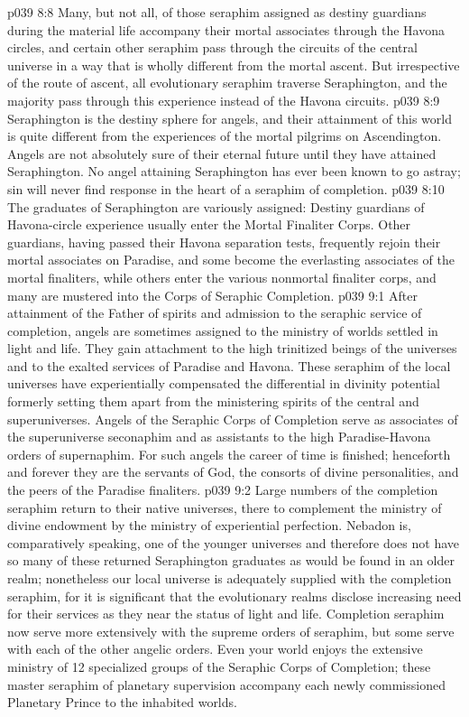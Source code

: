 \vs p039 8:8 Many, but not all, of those seraphim assigned as destiny guardians during the material life accompany their mortal associates through the Havona circles, and certain other seraphim pass through the circuits of the central universe in a way that is wholly different from the mortal ascent. But irrespective of the route of ascent, all evolutionary seraphim traverse Seraphington, and the majority pass through this experience instead of the Havona circuits.
\vs p039 8:9 \pc Seraphington is the destiny sphere for angels, and their attainment of this world is quite different from the experiences of the mortal pilgrims on Ascendington. Angels are not absolutely sure of their eternal future until they have attained Seraphington. No angel attaining Seraphington has ever been known to go astray; sin will never find response in the heart of a seraphim of completion.
\vs p039 8:10 The graduates of Seraphington are variously assigned: Destiny guardians of Havona\hyp{}circle experience usually enter the Mortal Finaliter Corps. Other guardians, having passed their Havona separation tests, frequently rejoin their mortal associates on Paradise, and some become the everlasting associates of the mortal finaliters, while others enter the various nonmortal finaliter corps, and many are mustered into the Corps of Seraphic Completion.
\vs p039 9:1 After attainment of the Father of spirits and admission to the seraphic service of completion, angels are sometimes assigned to the ministry of worlds settled in light and life. They gain attachment to the high trinitized beings of the universes and to the exalted services of Paradise and Havona. These seraphim of the local universes have experientially compensated the differential in divinity potential formerly setting them apart from the ministering spirits of the central and superuniverses. Angels of the Seraphic Corps of Completion serve as associates of the superuniverse seconaphim and as assistants to the high Paradise\hyp{}Havona orders of supernaphim. For such angels the career of time is finished; henceforth and forever they are the servants of God, the consorts of divine personalities, and the peers of the Paradise finaliters.
\vs p039 9:2 Large numbers of the completion seraphim return to their native universes, there to complement the ministry of divine endowment by the ministry of experiential perfection. Nebadon is, comparatively speaking, one of the younger universes and therefore does not have so many of these returned Seraphington graduates as would be found in an older realm; nonetheless our local universe is adequately supplied with the completion seraphim, for it is significant that the evolutionary realms disclose increasing need for their services as they near the status of light and life. Completion seraphim now serve more extensively with the supreme orders of seraphim, but some serve with each of the other angelic orders. Even your world enjoys the extensive ministry of 12 specialized groups of the Seraphic Corps of Completion; these master seraphim of planetary supervision accompany each newly commissioned Planetary Prince to the inhabited worlds.
